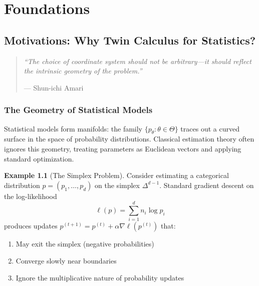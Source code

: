 \documentclass[11pt,twoside]{book}
\theoremstyle{plain}
\theoremstyle{definition}
\newtheorem{example}[theorem]{Example}
\theoremstyle{remark}
\newcommand{\simplex}{\Delta}
\begin{document}

\mainmatter


\part{Foundations}
\label{part:foundations}


\chapter{Motivations: Why Twin Calculus for Statistics?}
\label{ch:motivations}

\begin{quote}
    \textit{``The choice of coordinate system should not be arbitrary—it should reflect the intrinsic geometry of the problem.''}
    
    \hfill --- Shun-ichi Amari
\end{quote}

\section{The Geometry of Statistical Models}
\label{sec:geometry_stat_models}

Statistical models form manifolds: the family $\{p_\theta : \theta \in \Theta\}$ traces out a curved surface in the space of probability distributions. Classical estimation theory often ignores this geometry, treating parameters as Euclidean vectors and applying standard optimization.

\begin{example}[The Simplex Problem]
    Consider estimating a categorical distribution $p = (p_1, \ldots, p_d)$ on the simplex $\simplex^{d-1}$. Standard gradient descent on the log-likelihood
    \[
    \ell(p) = \sum_{i=1}^d n_i \log p_i
    \]
    produces updates $p^{(t+1)} = p^{(t)} + \alpha \nabla \ell(p^{(t)})$ that:
    \begin{enumerate}
        \item May exit the simplex (negative probabilities)
        \item Converge slowly near boundaries
        \item Ignore the multiplicative nature of probability updates
    \end{enumerate}
\end{example}
\end{document}

